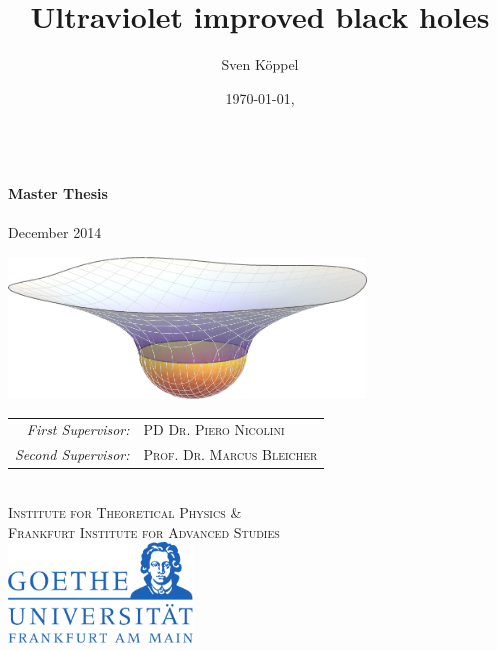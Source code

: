 \documentclass[12pt,a4paper]{report}
\title{Ultraviolet improved black holes}
\author{Sven Köppel}
\date{\today, \currenttime}
\numberwithin{equation}{chapter}
\def\thesubtitle{Master Thesis}
\begin{document}
\thispagestyle{empty}
   \begin{center}
    \Huge \textcolor{black!90}{\textbf{\thetitle}} \\
    \vspace{.5cm}
    \LARGE \textcolor{black!80}{\textbf{\thesubtitle}} \\
    \Large
   	\vspace{.9cm}
    \textsc{\theauthor} \\
    \vspace{.9cm} 
    	December 2014 \\
    \vspace{1.5cm}
    
    \includegraphics[width=9.5cm]{figures/titlepage-3d.png} \\
    \vfill{}
    \large
    \vspace{1.5cm}
    \begin{tabular}{@{}>{\itshape}rl@{}}
	  First Supervisor: & \textsc{PD Dr. Piero Nicolini} \\[1ex]
	  Second Supervisor: & \textsc{Prof. Dr. Marcus Bleicher}
    \end{tabular}
    \\
    \vspace{1cm}
    \Large
    \textcolor{black!70}{
    \textsc{Institute for Theoretical Physics \&} \\
    \textsc{Frankfurt Institute for Advanced Studies} \\
    }%
    \vspace{2cm}
    \includegraphics[width=4.9cm]{figures/goethe-logo.pdf}
	\end{center}
\end{document}
